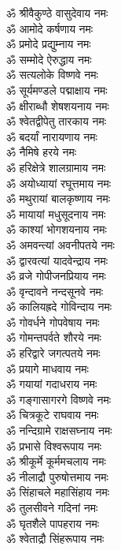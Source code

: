 \begin{multicols}{2}
\begin{flushleft}
ॐ श्रीवैकुण्ठे वासुदेवाय नमः\\
ॐ आमोदे कर्षणाय नमः\\
ॐ प्रमोदे प्रद्युम्नाय नमः\\
ॐ सम्मोदे ऐरुद्धाय नमः\\
ॐ सत्यलोके विष्णवे नमः\\
ॐ सूर्यमण्डले पद्माक्षाय नमः\\
ॐ क्षीराब्धौ शेषशयनाय नमः\\
ॐ श्वेतद्वीपेतु तारकाय नमः\\
ॐ बदर्यां नारायणाय नमः\\
ॐ नैमिषे हरये नमः\hfill{}\\
ॐ हरिक्षेत्रे शालग्रामाय नमः\\
ॐ अयोध्यायां रघूत्तमाय नमः\\
ॐ मथुरायां बालकृष्णाय नमः\\
ॐ मायायां मधुसूदनाय नमः\\
ॐ काश्यां भोगशयनाय नमः\\
ॐ अमवन्त्यां अवनीपतये नमः\\
ॐ द्वारवत्यां यादवेन्द्राय नमः\\
ॐ व्रजे गोपीजनप्रियाय नमः\\
ॐ वृन्दावने नन्दसूनवे नमः\\
ॐ कालियह्रदे गोविन्दाय नमः\hfill{}\\
ॐ गोवर्धने गोपवेषाय नमः\\
ॐ गोमन्तपर्वते शौरये नमः\\
ॐ हरिद्वारे जगत्पतये नमः\\
ॐ प्रयागे माधवाय नमः\\
ॐ गयायां गदाधराय नमः\\
ॐ गङ्गासागरगे विष्णवे नमः\\
ॐ चित्रकूटे राघवाय नमः\\
ॐ नन्दिग्रामे राक्षसघ्नाय नमः\\
ॐ प्रभासे विश्वरूपाय नमः\\
ॐ श्रीकूर्मे कूर्ममचलाय नमः\hfill{}\\
ॐ नीलाद्रौ पुरुषोत्तमाय नमः\\
ॐ सिंहाचले महासिंहाय नमः\\
ॐ तुलसीवने गदिनां नमः\\
ॐ घृतशैले पापहराय नमः\\
ॐ श्वेताद्रौ सिंहरूपाय नमः\\

\end{flushleft}
\end{multicols}

